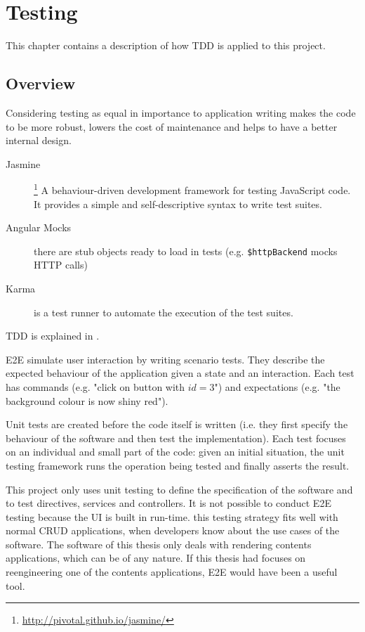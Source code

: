 \chapter{Testing}
This chapter contains a description of how \ac{TDD} is applied to this project.

\section{Overview}
Considering testing as equal in importance to application writing makes the code to be more robust, lowers the cost of maintenance and helps to have a better internal design.
\begin{description}
    \item[Jasmine]\footnote{\url{http://pivotal.github.io/jasmine/}} A behaviour-driven development framework for testing JavaScript code.
    It provides a simple and self-descriptive syntax to write test suites.
    \item[Angular Mocks] there are stub objects ready to load in tests (e.g. \texttt{\$httpBackend} mocks \ac{HTTP} calls)
    \item[Karma] is a test runner to automate the execution of the test suites. 
\end{description}

\ac{TDD} is explained in .

\ac{E2E} simulate user interaction by writing scenario tests.
They describe the expected behaviour of the application given a state and an interaction.
Each test has commands (e.g. "click on button with $id = 3$") and expectations (e.g. "the background colour is now shiny red").

Unit tests are created before the code itself is written (i.e. they first specify the behaviour of the software and then test the implementation).
Each test focuses on an individual and small part of the code: given an initial situation, the unit testing framework runs the operation being tested and finally asserts the result.

This project only uses unit testing to define the specification of the software and to test directives, services and controllers.
It is not possible to conduct \ac{E2E} testing because the \ac{UI} is built in run-time.
this testing strategy fits well with normal \ac{CRUD} applications, when developers know about the use cases of the software.
The software of this thesis only deals with rendering contents applications, which can be of any nature.
If this thesis had focuses on reengineering one of the contents applications, \ac{E2E} would have been a useful tool.

